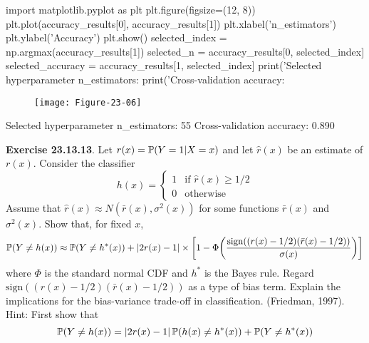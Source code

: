 \begin{python}
import matplotlib.pyplot as plt
plt.figure(figsize=(12, 8))
plt.plot(accuracy_results[0], accuracy_results[1])
plt.xlabel('n_estimators')
plt.ylabel('Accuracy')
plt.show()
selected_{i}ndex = np.argmax(accuracy_results[1])
selected_n = accuracy_results[0, selected_{i}ndex]
selected_accuracy = accuracy_results[1, selected_{i}ndex]
print('Selected hyperparameter n_estimators: %
print('Cross-validation accuracy: %
\end{python}

\begin{figure}[H]
\centering
\texttt{[image: Figure-23-06]}
\end{figure}

\begin{console}
Selected hyperparameter n\_estimators: 55
Cross-validation accuracy: 0.890
\end{console}

\textbf{Exercise 23.13.13}. Let \(r(x) = \operatorname{\mathbb{P}}(Y = 1 | X = x)\) and
let \(\hat{r}(x)\) be an estimate of \(r(x)\). Consider the classifier
\[
h(x) = \begin{cases}
1 &\text{if } \hat{r}(x) \geq 1/2 \\
0 &\text{otherwise}
\end{cases}
\]
Assume that \(\hat{r}(x) \approx N(\bar{r}(x), \sigma^{2}(x))\) for
some functions \(\bar{r}(x)\) and \(\sigma^{2}(x)\). Show that, for
fixed \(x\),
\[
\PROB(Y \neq h(x)) \approx \PROB(Y \neq h^{*}(x)) + 
\left| 2 r(x) - 1 \right| \times \left[ 1 - \Phi \left( \frac{\text{sign} \left( (r(x) - 1/2) (\bar{r}(x) - 1/2) \right)}{\sigma(x)} \right) \right]
\]
where \(\Phi\) is the standard normal CDF and \(h^{*}\) is the Bayes rule.
Regard
\(\text{sign} \left( (r(x) - 1/2) (\bar{r}(x) - 1/2) \right)\) as a
type of bias term. Explain the implications for the bias-variance
trade-off in classification. (Friedman, 1997).
Hint: First show that
\[
\operatorname{\mathbb{P}}(Y \neq h(x)) = |2 r(x) - 1| \operatorname{\mathbb{P}}(h(x) \neq h^{*}(x)) + \operatorname{\mathbb{P}}(Y \neq h^{*}(x))
\]

